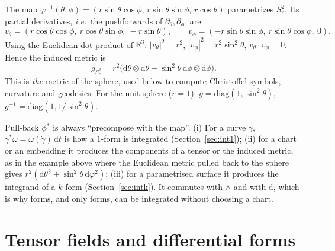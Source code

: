 \documentclass[11pt,a4paper]{article}
\numberwithin{equation}{section}
\theoremstyle{definition}
\theoremstyle{plain}
\newcommand{\R}{\mathbb{R}}
\newcommand{\dd}{\mathrm{d}}
\newcommand{\pb}{{}^{*}}                            %
\newcommand{\ie}{\emph{i.e.}\ }
\begin{document}
\begin{example}
The map $\varphi^{-1}(\theta,\phi)=(r\sin\theta\cos\phi,\,r\sin\theta\sin\phi,\,r\cos\theta)$ parametrizes $S^2_r$. Its partial derivatives, \ie the pushforwards of $\partial_\theta,\partial_\phi$, are
\[
v_\theta=(r\cos\theta\cos\phi,\ r\cos\theta\sin\phi,\ -r\sin\theta),\qquad
v_\phi=(-r\sin\theta\sin\phi,\ r\sin\theta\cos\phi,\ 0).
\]
Using the Euclidean dot product of $\R^3$: $|v_\theta|^2=r^2$, $|v_\phi|^2=r^2\sin^2\theta$, $v_\theta\cdot v_\phi=0$. Hence the induced metric is
\[
g_{S^2_r}=r^2\big(\dd\theta\otimes\dd\theta+\sin^2\theta\,\dd\phi\otimes\dd\phi\big).
\]
This is \emph{the} metric of the sphere, used below to compute Christoffel symbols, curvature and geodesics. For the unit sphere ($r=1$): $g=\mathrm{diag}(1,\sin^2\theta)$, $g^{-1}=\mathrm{diag}(1,1/\sin^2\theta)$.
\end{example}


\begin{synthesis}
Pull-back $\phi\pb$ is always ``precompose with the map''. (i) For a curve $\gamma$, $\gamma\pb\omega=\omega(\dot\gamma)\,\dd t$ is how a $1$-form is integrated (Section~\ref{sec:int1}); (ii) for a
chart or an embedding it produces the components of a tensor or the induced metric, as in the example above where the Euclidean metric pulled back to the sphere gives $r^2(\dd\theta^2+\sin^2\theta\,\dd\varphi^2)$; (iii) for a parametrised surface
it produces the integrand of a $k$-form (Section~\ref{sec:intk}). It commutes with $\wedge$ and with $\dd$, which is why forms, and only forms, can be integrated without choosing a chart.
\end{synthesis}

\section{Tensor fields and differential forms}\label{sec:fields}
\end{document}
